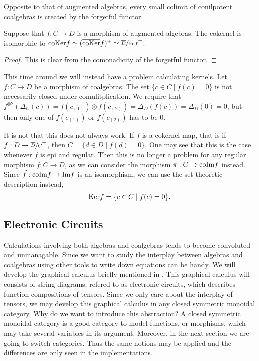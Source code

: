 \documentclass[../thesis.tex]{subfiles}
\begin{document}
                Opposite to that of augmented algebras, every small colimit of conilpotent coalgebras is created by the forgetful functor.

                \begin{lemma}
                    Suppose that $f: C \rightarrow D$ is a morphism of augmented algebras. The cokernel is isomorphic to $\tt{coKer}f \simeq (\overline{\tt{coKer}}f)^+ \simeq \sfrac{\overline{D}}{\overline{\tt{Im}}f}^+$.
                \end{lemma}

                \begin{proof}
                    This is clear from the comonadicity of the forgetful functor.
                \end{proof}

                This time around we will instead have a problem calculating kernels. Let $f : C \rightarrow D$ be a morphism of coalgebras. The set $\{c\in C \mid f(c) = 0\}$ is not necessarily closed under comulitplication. We require that $f^{\otimes 2}(\Delta_C(c)) = f(c_{(1)})\otimes f(c_{(2)}) = \Delta_D(f(c)) = \Delta_D(0) = 0$, but then only one of $f(c_{(1)})$ or $f(c_{(2)})$ has to be $0$.

                It is not that this does not always work. If $f$ is a cokernel map, that is if $f : D \rightarrow \sfrac{\overline{D}}{\overline{C}}^+$, then $C = \{d\in D \mid f(d) = 0\}$. One may see that this is the case whenever $f$ is epi and regular. Then this is no longer a problem for any regular morphism $f : C \rightarrow D$, as we can consider the morphism $\pi : C \rightarrow \tt{coIm}f$ instead. Since $\widetilde{f} : \tt{coIm}f \rightarrow \tt{Im}f$ is an isomorphism, we can use the set-theoretic description instead,
                \begin{align*}
                    \tt{Ker}f = \{c\in C \mid f(c) = 0\}\tt{.}
                \end{align*}

    \subsection{Electronic Circuits}
            Calculations involving both algebras and coalgebras tends to become convoluted and unmanagable. Since we want to study the interplay between algebras and coalgebras using other tools to write down equations can be handy. We will develop the graphical calculus briefly mentioned in \cite{Loday12}. This graphical calculus will consists of string diagrams, refered to as electronic circuits, which describes function compositions of tensors. Since we only care about the interplay of tensors, we may develop this graphical calculus in any closed symmetric monoidal category. Why do we want to introduce this abstraction? A closed symmetric monoidal category is a good category to model functions, or morphisms, which may take several variables in its argument. Moreover, in the next section we are going to switch categories. Thus the same notions may be applied and the differences are only seen in the implementations.
            
\end{document}
